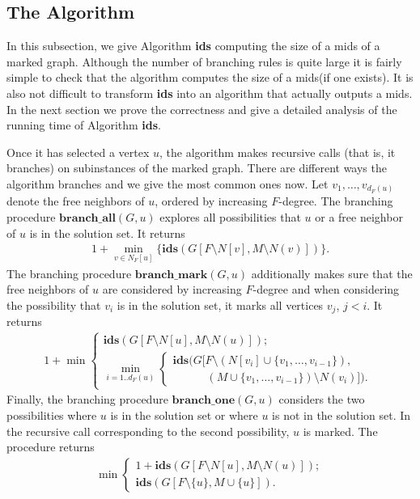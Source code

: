 \documentclass[a4paper,10pt]{article}
\theoremstyle{plain}
\theoremstyle{definition}
\theoremstyle{remark}
\newcommand{\mids}{mids\xspace}
\newcommand{\branchm}{\mathbf{branch\_mark}}
\newcommand{\brancha}{\mathbf{branch\_all}}
\newcommand{\brancho}{\mathbf{branch\_one}}
\begin{document}
\subsection{The Algorithm}
\label{sec:algo}

In this subsection, we give Algorithm {\bf ids} computing the size of a \mids
of a marked graph. Although the number of branching rules is quite large
it is fairly simple to check that the algorithm computes the size of
a \mids (if one exists). It is also not difficult to transform {\bf ids} into
an algorithm that actually outputs a \mids.
In the next section we prove the correctness and give a detailed analysis
of the running time of Algorithm {\bf ids}.

Once it has selected a vertex $u$, the algorithm makes recursive calls (that is, it branches)
on subinstances of the marked graph. There are different ways the algorithm branches and we
give the most common ones now. Let $v_1,\ldots ,v_{d_F(u)}$ denote the free neighbors of $u$, ordered by increasing $F$-degree.
The branching procedure $\brancha(G,u)$ explores all possibilities that $u$ or a free neighbor of $u$ is in the solution set. It returns
\begin{align*}
 1+\min_{v\in N_F[u]} \{ \mathbf{ids}(G[F\setminus N[v],M\setminus N(v)]) \}.
\end{align*}
The branching procedure $\branchm(G,u)$ additionally makes sure that the free neighbors of $u$ are considered by
increasing $F$-degree and when considering the possibility that $v_i$ is in the solution set, it marks all vertices $v_j$, $j<i$.
It returns
\begin{align*}
 1+\min \begin{cases}
	      \mathbf{ids}(G[F\setminus N[u],M\setminus N(u)]);\\
	      \min_{i=1..d_F(u)} \begin{cases}\mathbf{ids}(G[F\setminus (N[v_i] \cup \{v_1,\ldots,v_{i-1}\}),\\
	      \quad\quad\quad (M\cup \{v_1,\ldots,v_{i-1}\})\setminus N(v_i)]). \end{cases}
	    \end{cases}
\end{align*}
Finally, the branching procedure $\brancho(G,u)$ considers the two possibilities where $u$ is in the solution set or
where $u$ is not in the solution set. In the recursive call corresponding to the second possibility, $u$ is marked.
The procedure returns
\begin{align*}
 \min \begin{cases}
	      1+\mathbf{ids}(G[F\setminus N[u],M\setminus N(u)]);\\
	      \mathbf{ids}(G[F\setminus \{u\}, M\cup \{u\}]).
	    \end{cases}
\end{align*}
\end{document}
